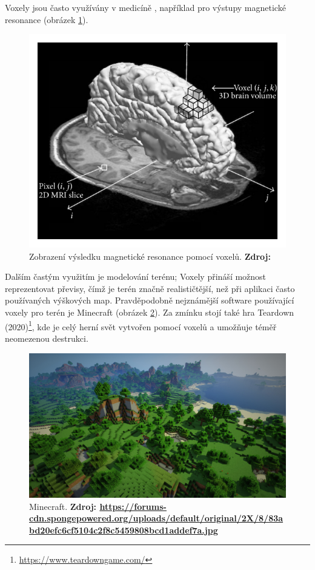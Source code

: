Voxely jsou často využívány v medicíně \cite{medical_vox}, například pro výstupy magnetické resonance (obrázek \ref{fig:mri_vox}).

\begin{figure}[H]
    \centering
    \includegraphics[scale=1]{obrazky-figures/voxel_mri.png}
    \caption{Zobrazení výsledku magnetické resonance pomocí voxelů. \textbf{Zdroj: \cite{mri}}}
    \label{fig:mri_vox}
\end{figure}

Dalším častým využitím je modelování terénu; Voxely přináší možnost reprezentovat převisy, čímž je terén značně realističtější, než při aplikaci často používaných výškových map. Pravděpodobně nejznámější software používající voxely pro terén je Minecraft (obrázek \ref{fig:minecraft}). Za zmínku stojí také hra Teardown (2020)\footnote{\url{https://www.teardowngame.com/}}, kde je celý herní svět vytvořen pomocí voxelů a umožňuje téměř neomezenou destrukci.

\begin{figure}[H]
    \centering
    \includegraphics[scale=0.2]{obrazky-figures/minecraft.jpg}
    \caption{Minecraft. \textbf{Zdroj: \url{https://forums-cdn.spongepowered.org/uploads/default/original/2X/8/83abd20efc6cf5104c2f8c5459808bcd1addef7a.jpg}}}
    \label{fig:minecraft}
\end{figure}

